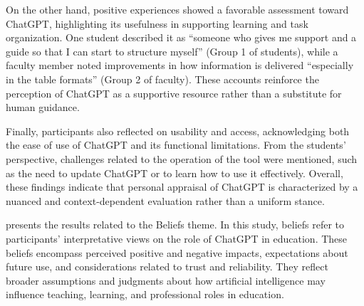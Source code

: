 \documentclass[english]{textolivre}
\begin{document}
On the other hand, positive experiences showed a favorable assessment toward ChatGPT, highlighting its usefulness in supporting learning and task organization. One student described it as “someone who gives me support and a guide so that I can start to structure myself” (Group 1 of students), while a faculty member noted improvements in how information is delivered “especially in the table formats” (Group 2 of faculty). These accounts reinforce the perception of ChatGPT as a supportive resource rather than a substitute for human guidance.

Finally, participants also reflected on usability and access, acknowledging both the ease of use of ChatGPT and its functional limitations. From the students’ perspective, challenges related to the operation of the tool were mentioned, such as the need to update ChatGPT or to learn how to use it effectively. Overall, these findings indicate that personal appraisal of ChatGPT is characterized by a nuanced and context-dependent evaluation rather than a uniform stance.

 presents the results related to the Beliefs theme. In this study, beliefs refer to participants’ interpretative views on the role of ChatGPT in education. These beliefs encompass perceived positive and negative impacts, expectations about future use, and considerations related to trust and reliability. They reflect broader assumptions and judgments about how artificial intelligence may influence teaching, learning, and professional roles in education.
\end{document}
